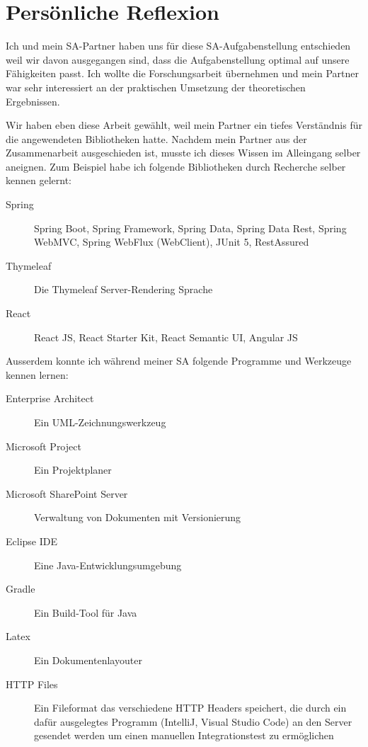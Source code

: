 \section*{Persönliche Reflexion}

Ich  und mein SA-Partner haben uns für diese SA-Aufgabenstellung entschieden weil wir davon ausgegangen sind, dass die Aufgabenstellung optimal auf unsere Fähigkeiten passt. Ich wollte die Forschungsarbeit übernehmen und mein Partner war sehr interessiert an der praktischen Umsetzung der theoretischen Ergebnissen.

Wir  haben eben diese Arbeit gewählt, weil mein Partner ein tiefes Verständnis für die angewendeten Bibliotheken hatte. Nachdem mein Partner aus der Zusammenarbeit ausgeschieden ist, musste ich dieses Wissen im Alleingang selber aneignen. Zum Beispiel habe ich folgende Bibliotheken durch Recherche selber kennen gelernt:

\begin{description}
    \item[Spring] Spring Boot, Spring Framework, Spring Data, Spring Data Rest, Spring WebMVC, Spring WebFlux (WebClient), JUnit 5, RestAssured
    \item[Thymeleaf] Die Thymeleaf Server-Rendering Sprache
    \item[React] React JS, React Starter Kit, React Semantic UI, Angular JS
\end{description}

Ausserdem konnte ich während meiner SA folgende Programme und Werkzeuge kennen lernen:
\begin{description}
    \item[Enterprise Architect] Ein UML-Zeichnungswerkzeug
    \item[Microsoft Project] Ein Projektplaner
    \item[Microsoft SharePoint Server] Verwaltung von Dokumenten mit Versionierung
    \item[Eclipse IDE] Eine Java-Entwicklungsumgebung
    \item[Gradle] Ein Build-Tool für Java
    \item[Latex] Ein Dokumentenlayouter
    \item[HTTP Files] Ein Fileformat das verschiedene HTTP Headers speichert, die durch ein dafür ausgelegtes Programm (IntelliJ, Visual Studio Code) an den Server gesendet werden um einen manuellen Integrationstest zu ermöglichen
\end{description}

